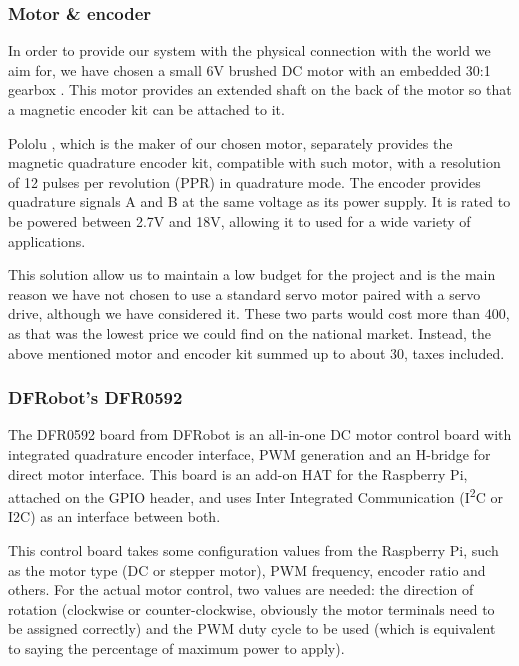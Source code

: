 \subsubsection{Motor \& encoder}
In order to provide our system with the physical connection with the world we aim for, we have chosen a small 6V brushed DC motor with an embedded 30:1 gearbox \cite{product:pololu-micrometal-gearmotor}.
This motor provides an extended shaft on the back of the motor so that a magnetic encoder kit can be attached to it.

Pololu \cite{brand:pololu}, which is the maker of our chosen motor, separately provides the magnetic quadrature encoder kit, compatible with such motor, with a resolution of 12 pulses per revolution (PPR) in quadrature mode.
The encoder provides quadrature signals A and B at the same voltage as its power supply.
It is rated to be powered between 2.7V and 18V, allowing it to used for a wide variety of applications.

This solution allow us to maintain a low budget for the project and is the main reason we have not chosen to use a standard servo motor paired with a servo drive, although we have considered it.
These two parts would cost more than 400\texteuro, as that was the lowest price we could find on the national market.
Instead, the above mentioned motor and encoder kit summed up to about 30\texteuro, taxes included.

\subsubsection{DFRobot's DFR0592}
The DFR0592 board from DFRobot is an all-in-one DC motor control board with integrated quadrature encoder interface, PWM generation and an H-bridge for direct motor interface.
This board is an add-on HAT for the Raspberry Pi, attached on the GPIO header, and uses Inter Integrated Communication (I\textsuperscript{2}C or I2C) as an interface between both.

This control board takes some configuration values from the Raspberry Pi, such as the motor type (DC or stepper motor), PWM frequency, encoder ratio and others.
For the actual motor control, two values are needed: the direction of rotation (clockwise or counter-clockwise, obviously the motor terminals need to be assigned correctly) and the PWM duty cycle to be used (which is equivalent to saying the percentage of maximum power to apply).


